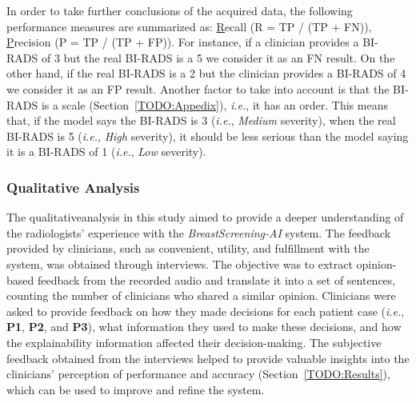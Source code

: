 In order to take further conclusions of the acquired data, the following performance measures are summarized as: \underline{R}ecall (R = \ac{TP} / (\ac{TP} + \ac{FN})), \underline{P}recision (P = \ac{TP} / (\ac{TP} + \ac{FP})).
For instance, if a clinician provides a \ac{BI-RADS} of 3 but the real \ac{BI-RADS} is a 5 we consider it as an \ac{FN} result.
On the other hand, if the real \ac{BI-RADS} is a 2 but the clinician provides a \ac{BI-RADS} of 4 we consider it as an \ac{FP} result.
Another factor to take into account is that the \ac{BI-RADS} is a scale (Section~\ref{TODO:Appedix}), {\it i.e.}, it has an order.
This means that, if the model says the \ac{BI-RADS} is 3 ({\it i.e.}, {\it Medium} severity), when the real \ac{BI-RADS} is 5 ({\it i.e.}, {\it High} severity), it should be less serious than the model saying it is a \ac{BI-RADS} of 1 ({\it i.e.}, {\it Low} severity).

\subsubsection{Qualitative Analysis}
\label{sec:chap005005004002}

The qualitative\footnotemark[24] analysis in this study aimed to provide a deeper understanding of the radiologists' experience with the {\it BreastScreening-AI} system.
The feedback provided by clinicians, such as convenient, utility, and fulfillment with the system, was obtained through interviews.
The objective was to extract opinion-based feedback from the recorded audio and translate it into a set of sentences, counting the number of clinicians who shared a similar opinion.
Clinicians were asked to provide feedback on how they made decisions for each patient case ({\it i.e.}, {\bf P1}, {\bf P2}, and {\bf P3}), what information they used to make these decisions, and how the explainability information affected their decision-making.
The subjective feedback obtained from the interviews helped to provide valuable insights into the clinicians' perception of performance and accuracy (Section~\ref{TODO:Results}), which can be used to improve and refine the system.


